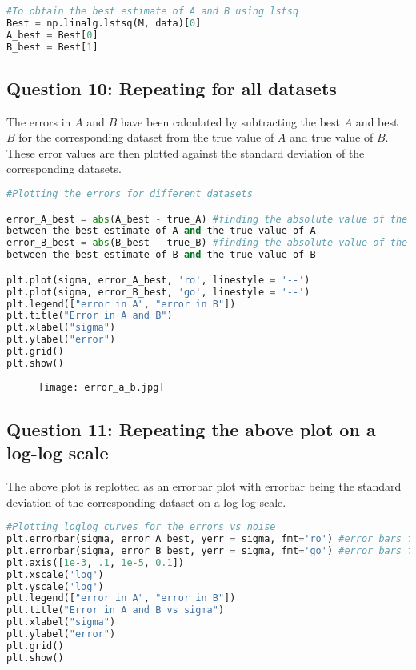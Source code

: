 \documentclass[11pt, a4paper]{article}
\begin{document}
\begin{lstlisting}[language = Python]
#To obtain the best estimate of A and B using lstsq
Best = np.linalg.lstsq(M, data)[0]
A_best = Best[0]
B_best = Best[1]
\end{lstlisting}

\subsection{Question 10: Repeating for all datasets}
The errors in $A$ and $B$ have been calculated by subtracting the best $A$ and best $B$ for the corresponding dataset from the true value of $A$ and true value of $B$. These error values are then plotted against the standard deviation of the corresponding datasets. \\

\begin{lstlisting}[language = Python]
#Plotting the errors for different datasets

error_A_best = abs(A_best - true_A) #finding the absolute value of the difference 
between the best estimate of A and the true value of A
error_B_best = abs(B_best - true_B) #finding the absolute value of the difference 
between the best estimate of B and the true value of B

plt.plot(sigma, error_A_best, 'ro', linestyle = '--')
plt.plot(sigma, error_B_best, 'go', linestyle = '--')
plt.legend(["error in A", "error in B"])
plt.title("Error in A and B")
plt.xlabel("sigma")
plt.ylabel("error")
plt.grid()
plt.show()
\end{lstlisting}

\begin{figure}[H]
     \centering
     \texttt{[image: error\_a\_b.jpg]}
\end{figure}


\subsection{Question 11: Repeating the above plot on a log-log scale}
The above plot is replotted as an errorbar plot with errorbar being the standard deviation of the corresponding dataset on a log-log scale. \\

\begin{lstlisting}[language = Python]
#Plotting loglog curves for the errors vs noise
plt.errorbar(sigma, error_A_best, yerr = sigma, fmt='ro') #error bars for A
plt.errorbar(sigma, error_B_best, yerr = sigma, fmt='go') #error bars for B
plt.axis([1e-3, .1, 1e-5, 0.1]) 
plt.xscale('log') 
plt.yscale('log')
plt.legend(["error in A", "error in B"])
plt.title("Error in A and B vs sigma")
plt.xlabel("sigma")
plt.ylabel("error")
plt.grid()
plt.show()
\end{lstlisting}
\end{document}
